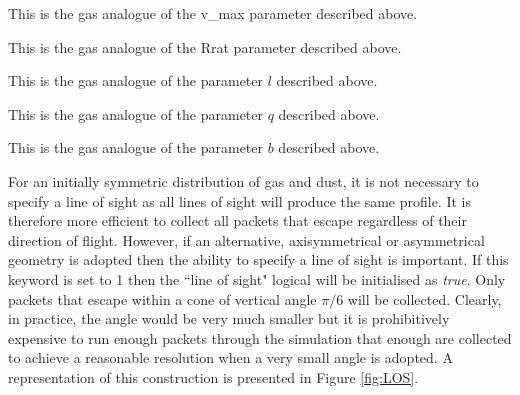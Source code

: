 
 This is the gas analogue of the v\_max parameter described above.  


 This is the gas analogue of the Rrat parameter described above.  


 This is the gas analogue of the parameter $l$ described above.  


 This is the gas analogue of the parameter $q$ described above.  


 This is the gas analogue of the parameter $b$ described above.  

\vspace{0.8cm}


 For an initially symmetric distribution of gas and dust, it is not necessary to specify a line of sight as all lines of sight will produce the same profile.  It is therefore more efficient to collect all packets that escape regardless of their direction of flight.  However, if an alternative, axisymmetrical or asymmetrical geometry is adopted then the ability to specify a line of sight is important.  If this keyword is set to 1 then the ``line of sight" logical will be initialised as \textit{true}.  Only packets that escape within a cone of vertical angle $\pi/6$ will be collected.  Clearly, in practice, the angle would be very much smaller but it is prohibitively expensive to run enough packets through the simulation that enough are collected to achieve a reasonable resolution when a very small  angle is adopted.  A representation of this construction is presented in Figure \ref{fig:LOS}.

